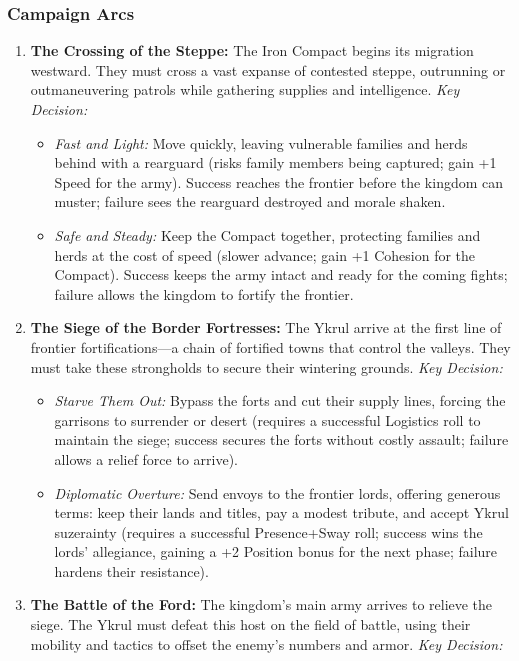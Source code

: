 \documentclass[11pt]{article}
\begin{document}
\subsubsection{Campaign Arcs}
\begin{enumerate}
\item \textbf{The Crossing of the Steppe:} The Iron Compact begins its migration westward. They must cross a vast expanse of contested steppe, outrunning or outmaneuvering patrols while gathering supplies and intelligence. \textit{Key Decision:}
\begin{itemize}
\item \textit{Fast and Light:} Move quickly, leaving vulnerable families and herds behind with a rearguard (risks family members being captured; gain +1 Speed for the army). Success reaches the frontier before the kingdom can muster; failure sees the rearguard destroyed and morale shaken.
\item \textit{Safe and Steady:} Keep the Compact together, protecting families and herds at the cost of speed (slower advance; gain +1 Cohesion for the Compact). Success keeps the army intact and ready for the coming fights; failure allows the kingdom to fortify the frontier.
\end{itemize}
\item \textbf{The Siege of the Border Fortresses:} The Ykrul arrive at the first line of frontier fortifications—a chain of fortified towns that control the valleys. They must take these strongholds to secure their wintering grounds. \textit{Key Decision:}
\begin{itemize}
\item \textit{Starve Them Out:} Bypass the forts and cut their supply lines, forcing the garrisons to surrender or desert (requires a successful Logistics roll to maintain the siege; success secures the forts without costly assault; failure allows a relief force to arrive).
\item \textit{Diplomatic Overture:} Send envoys to the frontier lords, offering generous terms: keep their lands and titles, pay a modest tribute, and accept Ykrul suzerainty (requires a successful Presence+Sway roll; success wins the lords' allegiance, gaining a +2 Position bonus for the next phase; failure hardens their resistance).
\end{itemize}
\item \textbf{The Battle of the Ford:} The kingdom's main army arrives to relieve the siege. The Ykrul must defeat this host on the field of battle, using their mobility and tactics to offset the enemy's numbers and armor. \textit{Key Decision:}

\end{enumerate}
\end{document}

